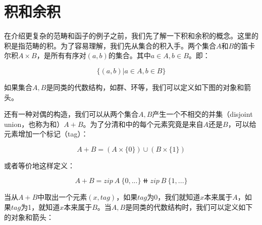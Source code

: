 \documentclass{article}
\begin{document}
\section{积和余积}

在介绍更复杂的范畴和函子的例子之前，我们先了解一下积和余积的概念。这里的积是指范畴的积。为了容易理解，我们先从集合的积入手。两个集合$A$和$B$的笛卡尔积$A \times B$，是所有有序对$(a, b)$的集合。其中$a \in A, b \in B$。即：

\[
\{(a, b) | a \in A, b \in B\}
\]

如果集合$A, B$是同类的代数结构，如群、环等，我们可以定义如下图的对象和箭头。

\begin{center}
\end{center}

还有一种对偶的构造，我们可以从两个集合$A, B$产生一个不相交的并集（disjoint union，也称为和）$A + B$。为了分清和中的每个元素究竟是来自$A$还是$B$，可以给元素增加一个标记（tag）：

\[
A + B = (A \times \{0\}) \cup (B \times \{1\})
\]

或者等价地这样定义：

\[
A + B = zip\ A\ \{0, ...\} \doubleplus zip\ B\ \{1, ...\}
\]

当从$A+B$中取出一个元素$(x, tag)$，如果$tag$为0，我们就知道$x$本来属于$A$，如果$tag$为1，就知道$x$本来属于$B$。当$A, B$是同类的代数结构时，我们可以定义如下的对象和箭头：

\begin{center}
\end{center}
\end{document}
